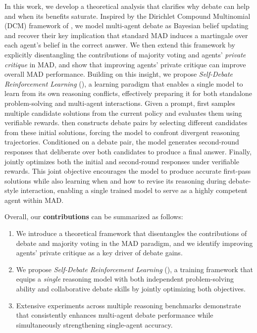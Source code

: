 In this work, we develop a theoretical analysis that clarifies why debate can help and when its benefits saturate. Inspired by the Dirichlet Compound Multinomial (DCM) framework of \citet{choi2025debate}, we model multi-agent debate as Bayesian belief updating and recover their key implication that standard MAD induces a martingale over each agent’s belief in the correct answer. We then extend this framework by explicitly disentangling the contributions of majority voting and agents’ \emph{private critique} in MAD, and show that improving agents’ private critique can improve overall MAD performance. Building on this insight, we propose \emph{Self-Debate Reinforcement Learning} (\SDRL{}), a learning paradigm that enables a single model to learn from its own reasoning conflicts, effectively preparing it for both standalone problem-solving and multi-agent interactions. Given a prompt, \SDRL{} first samples multiple candidate solutions from the current policy and evaluates them using verifiable rewards. \SDRL{} then constructs debate pairs by selecting different candidates from these initial solutions, forcing the model to confront divergent reasoning trajectories. Conditioned on a debate pair, the model generates second-round responses that deliberate over both candidates to produce a final answer. Finally, \SDRL{} jointly optimizes both the initial and second-round responses under verifiable rewards. This joint objective encourages the model to produce accurate first-pass solutions while also learning when and how to revise its reasoning during debate-style interaction, enabling a single trained model to serve as a highly competent agent within MAD.

Overall, our \textbf{contributions} can be summarized as follows:
\begin{enumerate}[itemsep=6pt, parsep=0pt, topsep=1pt]
    \item We introduce a theoretical framework that disentangles the contributions of debate and majority voting in the MAD paradigm, and we identify improving agents’ private critique as a key driver of debate gains.
    \item We propose \emph{Self-Debate Reinforcement Learning} (\SDRL{}), a training framework that equips a \emph{single} reasoning model with both independent problem-solving ability and collaborative debate skills by jointly optimizing both objectives.
    \item Extensive experiments across multiple reasoning benchmarks demonstrate that \SDRL{} consistently enhances multi-agent debate performance while simultaneously strengthening single-agent accuracy.
\end{enumerate}
